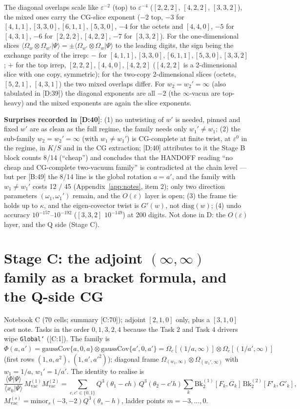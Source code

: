 \documentclass[10pt]{article}
\newcommand{\cl}[2]{\textsf{[#1:#2]}}
\newcommand{\Bk}{\mathrm{Bk}_2}
\newcommand{\Om}{\Omega}
\newcommand{\vac}{\mathrm{vac}}
\begin{document}
The diagonal overlaps scale like $\varepsilon^{-2}$ (top) to $\varepsilon^{-4}$ ($[2,2,2]$, $[4,2,2]$, $[3,3,2]$), the mixed ones carry the CG-slice exponent ($-2$ top, $-3$ for $[4,1,1],[3,3,0],[6,1,1],[5,3,0]$, $-4$ for the octets and $[4,4,0]$, $-5$ for $[4,3,1]$, $-6$ for $[2,2,2],[4,2,2]$, $-7$ for $[3,3,2]$). For the one-dimensional slices $\langle\Om_w\otimes\Om_{w'}|\Psi\rangle=\pm\langle\Om_{w'}\otimes\Om_w|\Psi\rangle$ to the leading digits, the sign being the exchange parity of the irrep: $-$ for $[4,1,1],[3,3,0],[6,1,1],[5,3,0],[3,3,2]$; $+$ for the top irrep, $[2,2,2],[4,4,0],[4,2,2]$ ($[4,2,2]$ is a 2-dimensional slice with one copy, symmetric); for the two-copy 2-dimensional slices (octets, $[5,2,1]$, $[4,3,1]$) the two mixed overlaps differ. For $w_2=w_2'=\infty$ (also tabulated in \cl{D}{39}) the diagonal exponents are all $-2$ (the $\infty$-vacua are top-heavy) and the mixed exponents are again the slice exponents.

\textbf{Surprises recorded in \cl{D}{40}}: (1) no untwisting of $w'$ is needed, pinned and fixed $w'$ are as clean as the full regime, the family needs only $w_1'\neq w_1$; (2) the sub-family $w_2=w_2'=\infty$ (with $w_1\neq w_1'$) is CG-complete at finite twist, at $\varepsilon^0$ in the regime, in $K/S$ and in the CG extraction; \cl{D}{40} attributes to it the Stage B block counts 8/14 (``cheap'') and concludes that the HANDOFF reading ``no cheap and CG-complete two-vacuum family'' is contradicted at the chain level --- but per \cl{B}{49} the 8/14 line is the global rotation $a=a'$, and the family with $w_1\neq w_1'$ costs 12 / 45 (Appendix~\ref{app:notes}, item 2); only two direction parameters $(\omega_1,\omega_1')$ remain, and the $O(\varepsilon)$ layer is open; (3) the frame tie holds up to $\kappa$, and the eigen-covector twist is $G'(w)$, not $\mathrm{diag}(w)$; (4) undo accuracy $10^{-157}$--$10^{-192}$ ($[3,3,2]$ $10^{-149}$) at 200 digits. Not done in D: the $O(\varepsilon)$ layer, and the Q side (Stage C).

\section{Stage C: the adjoint $(\infty,\infty)$ family as a bracket formula, and the Q-side CG}\label{sec:C}

Notebook C (70 cells; summary \cl{C}{70}); adjoint $[2,1,0]$ only, plus a $[3,1,0]$ cost note. Tasks in the order $0,1,3,2,4$ because the Task 2 and Task 4 drivers wipe \texttt{Global`} (\cl{C}{1}). The family is $\Phi(a,a')=\mathrm{gaussCov}\{a,0,a\}\otimes\mathrm{gaussCov}\{a',0,a'\}=\Om_c[(1/a,\infty)]\otimes\Om_c[(1/a',\infty)]$ (first rows $(1,a,a^2)$, $(1,a',a'^2)$); diagonal frame $\Om_{(w_1,\infty)}\otimes\Om_{(w_1',\infty)}$ with $w_1=1/a$, $w_1'=1/a'$. The identity to realise is
\[
\frac{\langle\Phi|\Psi\rangle}{\langle x_0|\Psi\rangle}\,M^{(1)}_\vac M^{(2)}_\vac=\sum_{c,c'\in\{0,1\}}Q^3(\theta_1-ch)\,Q^3(\theta_2-c'h)\sum_k\Bk^{(1)}[F_k,G_k]\,\Bk^{(2)}[F'_k,G'_k],
\]
$M^{(s)}_\vac=\mathrm{minor}_s(-3,-2)Q^3(\theta_s-h)$, ladder points $m=-3,\dots,0$.
\end{document}
